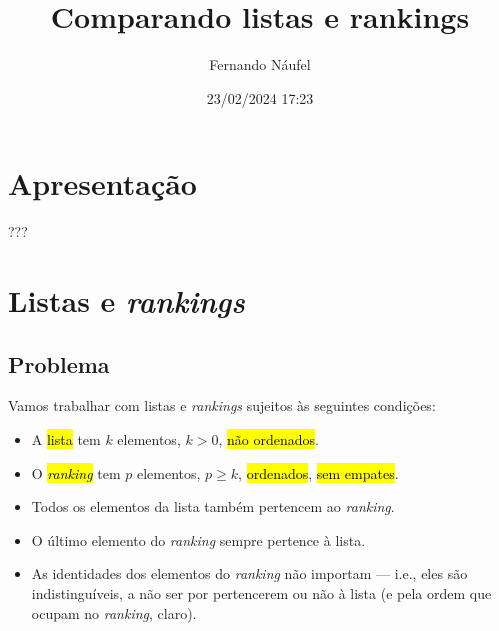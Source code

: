 \documentclass[
  letterpaper,
  DIV=11,
  numbers=noendperiod]{scrreprt}
\title{Comparando listas e rankings}
\author{Fernando Náufel}
\date{23/02/2024 17:23}
\renewcommand*\contentsname{Índice}
\newcommand\contentsname{Índice}
\begin{document}
\maketitle

\makeatletter
{}
{}
{}
\makeatother


\renewcommand*\contentsname{Índice}
{
\hypersetup{linkcolor=}
\setcounter{tocdepth}{2}
\tableofcontents
}

\chapter*{Apresentação}\label{apresentauxe7uxe3o}


???


\chapter{\texorpdfstring{Listas e
\emph{rankings}}{Listas e rankings}}\label{listas-e-rankings}

\section{Problema}\label{problema}

Vamos trabalhar com listas e \emph{rankings} sujeitos às seguintes
condições:

\begin{itemize}
\item
  A {\hl{lista}} tem $k$ elementos, $k > 0$, {\hl{não ordenados}}.
\item
  O {\hl{\emph{ranking}}} tem $p$ elementos, $p \geq k$,
  {\hl{ordenados}}, {\hl{sem empates}}.
\item
  Todos os elementos da lista também pertencem ao \emph{ranking}.
\item
  O último elemento do \emph{ranking} sempre pertence à lista.
\item
  As identidades dos elementos do \emph{ranking} não importam --- i.e.,
  eles são indistinguíveis, a não ser por pertencerem ou não à lista (e
  pela ordem que ocupam no \emph{ranking}, claro).
\end{itemize}
\end{document}
